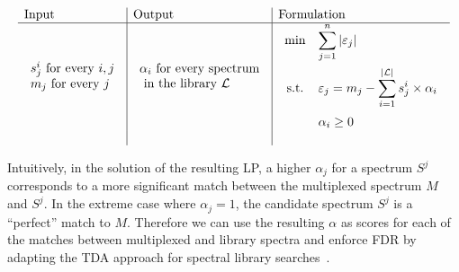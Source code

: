\documentclass[arial,11pt]{article}
\begin{document}
\[
\begin{array}{l|l|l}
{\rm Input} & {\rm Output} & {\rm Formulation} \\
\hline
\begin{array}{l}
s^{i}_j \mbox{ for every  } i, j \\
m_j \mbox{ for every  } j \\
\end{array}&
\begin{array}{l} \alpha_i \mbox{ for every spectrum}\\
                      \mbox{ in the library $\mathcal{L}$ }
\end{array}&
\begin{array}{cll}
\min &{\displaystyle \sum_{j=1}^{n}{|\varepsilon_j|}}\\[1.5em]
{\rm s.t.}&{\displaystyle \varepsilon_j = m_j - \sum_{i=1}^{|\mathcal{L}|} s^{i}_j \times{\alpha_i} }\\
[1.5em]
&{\displaystyle \alpha_i\geq 0} \\
\end{array}\\
&&\\
\end{array}\\
\]

Intuitively, in the solution of the resulting LP, a higher $\alpha_{j}$ for a  spectrum $S^{j}$ corresponds to a more significant match between the multiplexed spectrum $M$ and $S^{j}$.  In the extreme case where $\alpha_j=1$, the candidate spectrum $S^{j}$ is a ``perfect'' match to $M$.  Therefore we can use the resulting $\alpha$ as scores for each of the matches between multiplexed and library spectra and enforce FDR by adapting the TDA approach for spectral library searches~\cite{lamdecoylib}.
\end{document}
